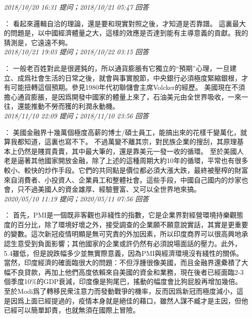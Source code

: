 \documentclass[twocolumn]{ctexart}
\begin{document}
\textit{\hfill\noindent\small 2018/10/20 16:31 提问；2018/10/21 05:47 回答}

：
看起來邏輯自洽的理論，還是要和現實對照之後，才知道是否靠譜。
這裏最大的問題是，以中國經濟體量之大，這樣的效應是否達到能有主導意義的貢獻。我的猜測是，它遠遠不夠。
\\

\textit{\hfill\noindent\small 2018/10/21 19:03 提问；2018/10/22 03:15 回答}

：
一般老百姓對此是很遲鈍的，所以通貨膨脹有它獨立的“預期”心理，一旦建立、成爲社會生活的日常之後，就會與事實脫節，中央銀行必須極度緊縮銀根，才有可能扭轉這個預期。參見1980年代初聯儲會主席Volcker的經歷。
美國現在不須擔心通貨膨脹，是因爲開發中國家的體量上來了，石油美元由全世界吸收，一來一往，還能推動不勞而獲的利潤永動機。
\\

\textit{\hfill\noindent\small 2018/11/10 22:09 提问；2018/11/10 23:56 回答}

：
美國金融界十幾萬個極度高薪的博士/碩士員工，能搞出來的花樣千變萬化，就算我都知道，這裏也寫不下。
不過萬變不離其宗，對民族企業的搜刮，其原理基本上仍然是賤買貴賣，其中最大筆的，還是靠美元一發一收的循環。
至於美國人老是逼著其他國家開放金融，除了上述的這種周期大約10年的循環，平常也有很多較小、較快的炒作手段。它們的共同點是價位都必須大漲大跌，最終被壓榨的財富來自消費者、小投資人、企業員工和整體社會。這些手段，中國自己國内的炒家也會，只不過美國人的資金雄厚、經驗豐富、又可以全世界地來搞。
\\

\textit{\hfill\noindent\small 2020/05/10 11:19 提问；2020/05/11 07:56 回答}

：
首先，PMI是一個既非客觀也非綫性的指數，它是企業界對經營環境持樂觀態度的百分比，除了環境好壞之外，接受調查的企業願不願意說實話，其實是更重要的變數。這次新冠疫情明顯是無可究責的外加因素，所以印度商界可以很高興地承認生意受到負面影響；其他國家的企業或許仍然有必須說場面話的壓力。此外，5.4雖低，但是說跌幅多少並無實際意義，因為PMI與經濟環境沒有綫性的關係。 
當然，印度經濟的確面臨很大的問題：不但浮腫很像美國，而且金融界還纍積了大幅不良貸款，再加上他們高度依賴來自美國的資金和業務，現在後者已經面臨2-3個季度10\%的GDP衰減，印度像是狗尾巴，搖動的幅度會比狗屁股再增加幾倍。 
至於Modi爲了轉移民衆注意力而發動戰爭的機率，反而因爲新冠而極度減小，這是因爲上面已經提過的，疫情本身就是絕佳的藉口，雖然人謀不臧才是主因，但他已經可以簡單卸責，也就無須在國際上冒險。
\\
\end{document}
